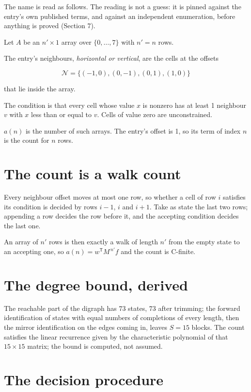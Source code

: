 \documentclass[11pt]{article}
\theoremstyle{definition}
\begin{document}
The name is read as follows. The reading is not a guess: it is pinned against the entry's own published terms, and against an independent enumeration, before anything is proved (Section 7).

Let $A$ be an $n' \times 1$ array over $\{0,\dots,7\}$ with $n' = n$ rows.

The entry's neighbours, {\itshape horizontal or vertical}, are the cells at the offsets

\[\mathcal{N} = \{(-1,0), (0,-1), (0,1), (1,0)\}\]

that lie inside the array.

The condition is that every cell whose value $x$ is nonzero has at least 1 neighbour $v$ with $x$ less than or equal to $v$. Cells of value zero are unconstrained.

$a(n)$ is the number of such arrays. The entry's offset is 1, so its term of index $n$ is the count for $n$ rows.

\section{The count is a walk count}

Every neighbour offset moves at most one row, so whether a cell of row $i$ satisfies its condition is decided by rows $i-1$, $i$ and $i+1$. Take as state the last two rows; appending a row decides the row before it, and the accepting condition decides the last one.

An array of $n'$ rows is then exactly a walk of length $n'$ from the empty state to an accepting one, so $a(n) = w^{\mathsf T}M^{\,n'}f$ and the count is C-finite.

\section{The degree bound, derived}

The reachable part of the digraph has $73$ states, $73$ after trimming; the forward identification of states with equal numbers of completions of every length, then the mirror identification on the edges coming in, leaves $S = 15$ blocks. The count satisfies the linear recurrence given by the characteristic polynomial of that $15\times15$ matrix; the bound is computed, not assumed.

\section{The decision procedure}
\end{document}
